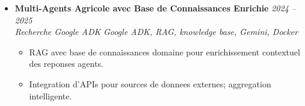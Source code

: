 \documentclass[a4paper,11pt]{article}
\begin{document}
\begin{itemize}[leftmargin=*, label={-}]
\item \textbf{Multi-Agents Agricole avec Base de Connaissances Enrichie} \hfill \textit{2024 -- 2025} \\
\textit{Recherche Google ADK} \hfill \textit{Google ADK, RAG, knowledge base, Gemini, Docker}
\vspace{-2pt}
    \begin{itemize}[leftmargin=0.4cm, nosep, label=\tiny$\bullet$]
        \item \small{RAG avec base de connaissances domaine pour enrichissement contextuel des reponses agents.}
        \item \small{Integration d'APIs pour sources de donnees externes; aggregation intelligente.}
    \end{itemize}

\end{itemize}
\end{document}
